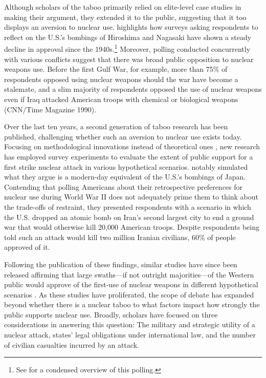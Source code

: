 \documentclass[12pt]{article}
\begin{document}
Although scholars of the taboo primarily relied on elite-level case studies in making their argument, they extended it to the public, suggesting that it too displays an aversion to nuclear use. \citet{tannewald_nuclear_2007}  highlights how surveys asking respondents to reflect on the U.S.'s bombings of Hiroshima and Nagasaki have shown a steady decline in approval since the 1940s.\footnote{See \citet{sagan_revisiting_2017} for a condensed overview of this polling.} Moreover, polling conducted concurrently with various conflicts suggest that there was broad public opposition to nuclear weapons use. Before the first Gulf War, for example, more than 75\% of respondents opposed using nuclear weapons should the war have become a stalemate, and a slim majority of respondents opposed the use of nuclear weapons even if Iraq attacked American troops with chemical or biological weapons (CNN/Time Magazine 1990).

Over the last ten years, a second generation of taboo research has been published, challenging whether such an aversion to nuclear use exists today. Focusing on methodological innovations instead of theoretical ones \citep{smetana_forum_2021}, new research has employed survey experiments to evaluate the extent of public support for a first strike nuclear attack in various hypothetical scenarios. \citet{sagan_revisiting_2017} notably simulated what they argue is a modern-day equivalent of the U.S.'s bombings of Japan. Contending that polling Americans about their retrospective preferences for nuclear use during World War II does not adequately prime them to think about the trade-offs of restraint, they presented respondents with a scenario in which the U.S. dropped an atomic bomb on Iran's second largest city to end a ground war that would otherwise kill 20,000 American troops. Despite respondents being told such an attack would kill two million Iranian civilians, 60\% of people approved of it.

Following the publication of these findings, similar studies have since been released affirming that large swaths—if not outright majorities—of the Western public would approve of the first-use of nuclear weapons in different hypothetical scenarios \citep{aronow_note_2019,haworth_what_2019, dill_kettles_2022,schwartz_when_2024}. As these studies have proliferated, the scope of debate has expanded beyond whether there is a nuclear taboo to what factors impact how strongly the public supports nuclear use. Broadly, scholars have focused on three considerations in answering this question: The military and strategic utility of a nuclear attack, states' legal obligations under international law, and the number of civilian casualties incurred by an attack.
\end{document}
